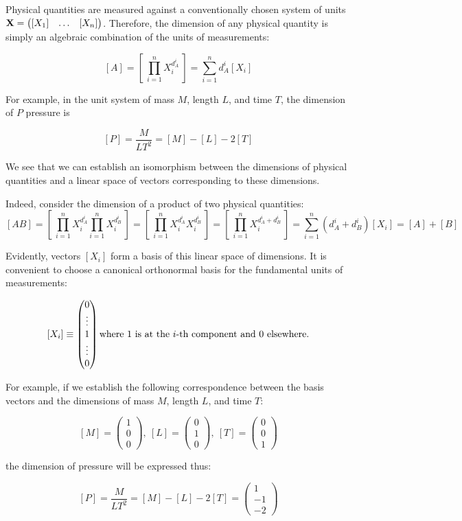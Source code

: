 Physical quantities are measured against a conventionally chosen system of units $\mathbf{X} = \begin{pmatrix} [X_1] & \hdots & [X_n] \end{pmatrix}$. Therefore, the dimension of any physical quantity is simply an algebraic combination of the units of measurements: 

$$[A] = [ ~\prod \limits_{i=1}^{n} X_i^{d_A^i}~ ] = \sum \limits_{i=1}^n d_A^i [X_i]$$ 

For example, in the unit system of mass $M$, length $L$, and time $T$, the dimension of $P$ pressure is 

$$[P] = \frac{M}{LT^2} = [M] - [L] - 2 [T] $$

We see that we can establish an isomorphism between the dimensions of physical quantities and a linear space of vectors corresponding to these dimensions. 

Indeed, consider the dimension of a product of two physical quantities:
$$[AB] = [~ \prod \limits_{i=1}^{n} X_i^{d_A^i} \prod \limits_{i=1}^{n} X_i^{d_B^i} ~] =  [~ \prod \limits_{i=1}^{n} X_i^{d_A^i}X_i^{d_B^i} ~] = [~ \prod \limits_{i=1}^{n} X_i^{d_A^i + d_B^i} ~] = \sum \limits_{i=1}^n (d_A^i + d_B^i) [X_i] = [A] + [B] $$

Evidently, vectors $[X_i]$ form a basis of this linear space of dimensions. It is convenient to choose a canonical orthonormal basis for the fundamental units of measurements:

$$ [X_i] \equiv \begin{pmatrix} 0 \\ \vdots \\ 1 \\ \vdots \\ 0 \end{pmatrix} \text{where $1$ is at the $i$-th component and $0$ elsewhere.} $$

For example, if we establish the following correspondence between the basis vectors and the dimensions of mass $M$, length $L$, and time $T$:

$$ [M] =  \begin{pmatrix} 1 \\ 0 \\ 0 \end{pmatrix},~ [L] =  \begin{pmatrix} 0 \\ 1 \\ 0 \end{pmatrix},~ [T] =  \begin{pmatrix} 0 \\ 0 \\ 1 \end{pmatrix}$$

the dimension of pressure will be expressed thus:

$$[P] = \frac{M}{LT^2} = [M] - [L] - 2 [T] = \begin{pmatrix} 1 \\ -1 \\ -2 \end{pmatrix} $$


